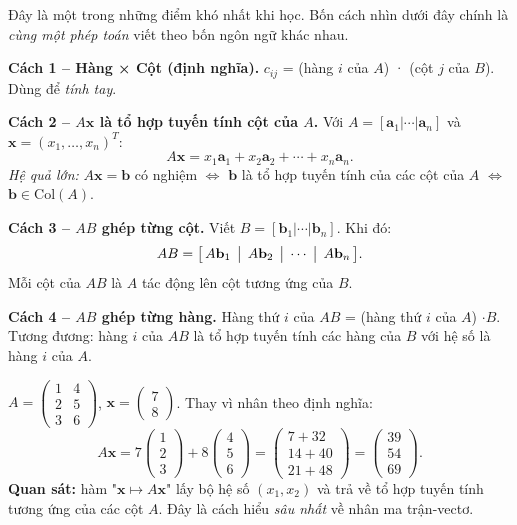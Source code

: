 \documentclass[12pt,a4paper]{article}
\begin{document}
\begin{ynghia}[title={Bốn cách nhìn phép nhân $AB$ (rất quan trọng)}]
Đây là một trong những điểm khó nhất khi học. Bốn cách nhìn dưới đây chính là \emph{cùng một phép toán} viết theo bốn ngôn ngữ khác nhau.

\medskip
\textbf{Cách 1 -- Hàng × Cột (định nghĩa).} $c_{ij}$ = (hàng $i$ của $A$) · (cột $j$ của $B$). Dùng để \emph{tính tay}.

\medskip
\textbf{Cách 2 -- $A\mathbf{x}$ là tổ hợp tuyến tính cột của $A$.} Với $A = [\mathbf{a}_1 | \cdots | \mathbf{a}_n]$ và $\mathbf{x} = (x_1, \ldots, x_n)^T$:
\[
  A\mathbf{x} = x_1 \mathbf{a}_1 + x_2 \mathbf{a}_2 + \cdots + x_n \mathbf{a}_n.
\]
\emph{Hệ quả lớn:} $A\mathbf{x} = \mathbf{b}$ có nghiệm $\Leftrightarrow$ $\mathbf{b}$ là tổ hợp tuyến tính của các cột của $A$ $\Leftrightarrow$ $\mathbf{b} \in \mathrm{Col}(A)$.

\medskip
\textbf{Cách 3 -- $AB$ ghép từng cột.} Viết $B = [\mathbf{b}_1 | \cdots | \mathbf{b}_n]$. Khi đó:
\[
  AB = \bigl[\, A\mathbf{b}_1 \,\bigm|\, A\mathbf{b}_2 \,\bigm|\, \cdots \,\bigm|\, A\mathbf{b}_n \,\bigr].
\]
Mỗi cột của $AB$ là $A$ tác động lên cột tương ứng của $B$.

\medskip
\textbf{Cách 4 -- $AB$ ghép từng hàng.} Hàng thứ $i$ của $AB$ = (hàng thứ $i$ của $A$) $\cdot B$. Tương đương: hàng $i$ của $AB$ là tổ hợp tuyến tính các hàng của $B$ với hệ số là hàng $i$ của $A$.
\end{ynghia}

\begin{vidu}[title={Cách 2 tại hành: $A\mathbf{x}$ trộn các cột}]
$A = \begin{pmatrix}1 & 4 \\ 2 & 5 \\ 3 & 6\end{pmatrix}$, $\mathbf{x} = \begin{pmatrix}7\\8\end{pmatrix}$. Thay vì nhân theo định nghĩa:
\[
  A\mathbf{x} = 7\begin{pmatrix}1\\2\\3\end{pmatrix} + 8\begin{pmatrix}4\\5\\6\end{pmatrix} = \begin{pmatrix}7+32\\14+40\\21+48\end{pmatrix} = \begin{pmatrix}39\\54\\69\end{pmatrix}.
\]
\textbf{Quan sát:} hàm "$\mathbf{x} \mapsto A\mathbf{x}$" lấy bộ hệ số $(x_1, x_2)$ và trả về tổ hợp tuyến tính tương ứng của các cột $A$. Đây là cách hiểu \emph{sâu nhất} về nhân ma trận-vectơ.
\end{vidu}
\end{document}
